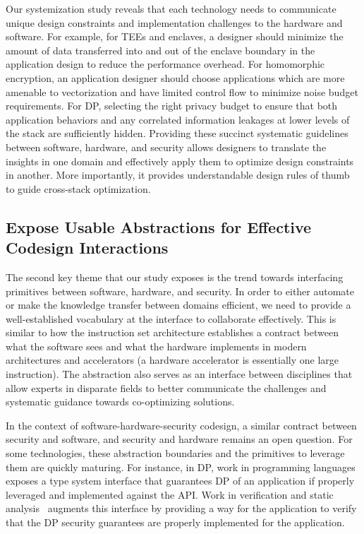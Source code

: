 Our systemization study reveals that each technology needs to communicate unique design constraints and implementation challenges to the hardware and software.
For example, for TEEs and enclaves, a designer should minimize the amount of data transferred into and out of the enclave boundary in the application design to reduce the performance overhead.
For homomorphic encryption, an application designer should choose applications which are more amenable to vectorization and have limited control flow to minimize noise budget requirements.
For DP, selecting the right privacy budget to ensure that both application behaviors and any correlated information leakages at lower levels of the stack are sufficiently hidden.
Providing these succinct systematic guidelines between software, hardware, and security allows designers to translate the insights in one domain and effectively apply them to optimize design constraints in another.
More importantly, it provides understandable design rules of thumb to guide cross-stack optimization.

\subsection{Expose Usable Abstractions for Effective Codesign Interactions}

The second key theme that our study exposes is the trend towards interfacing primitives between software, hardware, and security.
In order to either automate or make the knowledge transfer between domains efficient, we need to provide a well-established vocabulary at the interface to collaborate effectively.
This is similar to how the instruction set architecture establishes a contract between what the software sees and what the hardware implements in modern architectures and accelerators (a hardware accelerator is essentially one large instruction).
The abstraction also serves as an interface between disciplines that allow experts in disparate fields to better communicate the challenges and systematic guidance towards co-optimizing solutions.

In the context of software-hardware-security codesign, a similar contract between security and software, and security and hardware remains an open question.
For some technologies, these abstraction boundaries and the primitives to leverage them are quickly maturing.
For instance, in DP, work in programming languages exposes a type system interface that guarantees DP of an application if properly leveraged and implemented against the API.
Work in verification and static analysis~\cite{near2019duet} augments this interface by providing a way for the application to verify that the DP security guarantees are properly implemented for the application.


